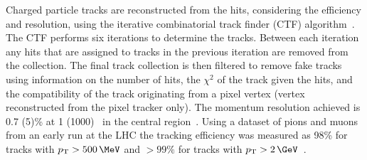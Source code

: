 %
Charged particle tracks are reconstructed from the hits, considering the efficiency and resolution, 
using the iterative combinatorial track finder (CTF) algorithm~\cite{tracker_early}. The CTF performs 
six iterations to determine the tracks. Between each iteration any hits that are assigned to tracks in the
previous iteration are removed from the collection. The final track collection is then filtered to remove fake tracks using 
information on the number of hits, the $\chi^2$ of the track given the hits, and the compatibility of the track originating from a pixel vertex (vertex reconstructed from
the pixel tracker only). The momentum 
resolution achieved is 0.7 (5)\% at 1 (1000) \GeV~in the central region~\cite{tracker_early}. Using a dataset of pions and muons from an early run 
at the LHC the tracking efficiency was measured as 98\% for tracks with $\pt > 500\,\MeV$ and $>99\%$ for tracks with $\pt > 2\,\GeV$~\cite{tracker_eff}.

